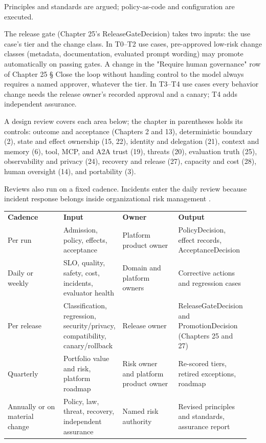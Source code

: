 Principles and standards are argued; policy-as-code and configuration are executed.\par

The release gate (Chapter 25's ReleaseGateDecision) takes two inputs: the use case's tier and the change class. In T0–T2 use cases, pre-approved low-risk change classes (metadata, documentation, evaluated prompt wording) may promote automatically on passing gates. A change in the "Require human governance" row of Chapter 25 § Close the loop without handing control to the model always requires a named approver, whatever the tier. In T3–T4 use cases every behavior change needs the release owner's recorded approval and a canary; T4 adds independent assurance.\par

A design review covers each area below; the chapter in parentheses holds its controls: outcome and acceptance (Chapters 2 and 13), deterministic boundary (2), state and effect ownership (15, 22), identity and delegation (21), context and memory (6), tool, MCP, and A2A trust (19), threats (20), evaluation truth (25), observability and privacy (24), recovery and release (27), capacity and cost (28), human oversight (14), and portability (3).\par

Reviews also run on a fixed cadence. Incidents enter the daily review because incident response belongs inside organizational risk management .\par

\BookTableStart
\fontsize{7.2}{9}\selectfont
\begin{tabular}{@{}Y{0.2350\linewidth}Y{0.2350\linewidth}Y{0.2350\linewidth}Y{0.2350\linewidth}@{}}
\color{white}\bfseries \textbf{Cadence} & \color{white}\bfseries \textbf{Input} & \color{white}\bfseries \textbf{Owner} & \color{white}\bfseries \textbf{Output} \\
Per run & Admission, policy, effects, acceptance & Platform product owner & PolicyDecision, effect records, AcceptanceDecision \\
Daily or weekly & SLO, quality, safety, cost, incidents, evaluator health & Domain and platform owners & Corrective actions and regression cases \\
Per release & Classification, regression, security/privacy, compatibility, canary/rollback & Release owner & ReleaseGateDecision and PromotionDecision (Chapters 25 and 27) \\
Quarterly & Portfolio value and risk, platform roadmap & Risk owner and platform product owner & Re-scored tiers, retired exceptions, roadmap \\
Annually or on material change & Policy, law, threat, recovery, independent assurance & Named risk authority & Revised principles and standards, assurance report \\
\end{tabular}
\BookTableEnd

